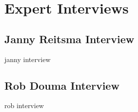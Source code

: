 \chapter{Expert Interviews}
\label{appendix:ExpertInterviews}
\section{Janny Reitsma Interview}
janny interview
\section{Rob Douma Interview}
rob interview
